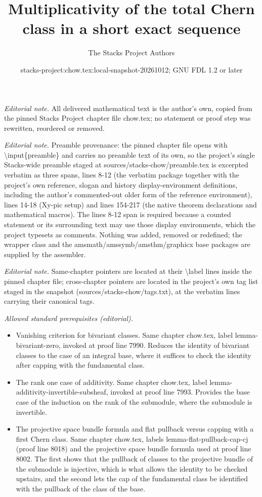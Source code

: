 \documentclass[10pt,a4paper]{amsart}
\title{Multiplicativity of the total Chern class in a short exact sequence}
\author{The Stacks Project Authors}
\date{stacks-project:chow.tex:local-snapshot-20261012; GNU FDL 1.2 or later}
\theoremstyle{plain}
\theoremstyle{definition}
\theoremstyle{remark}
\numberwithin{equation}{subsection}
\begin{document}
\maketitle
\noindent\textit{Editorial note.} All delivered mathematical text is the author's own, copied from the pinned Stacks Project chapter file chow.tex; no statement or proof step was rewritten, reordered or removed.\par\medskip
\noindent\textit{Editorial note.} Preamble provenance: the pinned chapter file opens with \textbackslash{}input\{preamble\} and carries no preamble text of its own, so the project's single Stacks-wide preamble staged at sources/stacks-chow/preamble.tex is excerpted verbatim as three spans, lines 8-12 (the verbatim package together with the project's own reference, slogan and history display-environment definitions, including the author's commented-out older form of the reference environment), lines 14-18 (Xy-pic setup) and lines 154-217 (the native theorem declarations and mathematical macros). The lines 8-12 span is required because a counted statement or its surrounding text may use those display environments, which the project typesets as comments. Nothing was added, removed or redefined; the wrapper class and the amsmath/amssymb/amsthm/graphicx base packages are supplied by the assembler.\par\medskip
\noindent\textit{Editorial note.} Same-chapter pointers are located at their \textbackslash{}label lines inside the pinned chapter file; cross-chapter pointers are located in the project's own tag list staged in the snapshot (sources/stacks-chow/tags.txt), at the verbatim lines carrying their canonical tags.\par\medskip
\noindent\textit{Allowed standard prerequisites (editorial).}\begin{itemize}
\item Vanishing criterion for bivariant classes. Same chapter chow.tex, label lemma-bivariant-zero, invoked at proof line 7990. Reduces the identity of bivariant classes to the case of an integral base, where it suffices to check the identity after capping with the fundamental class.
\item The rank one case of additivity. Same chapter chow.tex, label lemma-additivity-invertible-subsheaf, invoked at proof line 7993. Provides the base case of the induction on the rank of the submodule, where the submodule is invertible.
\item The projective space bundle formula and flat pullback versus capping with a first Chern class. Same chapter chow.tex, labels lemma-flat-pullback-cap-cj (proof line 8018) and the projective space bundle formula used at proof line 8002. The first shows that the pullback of classes to the projective bundle of the submodule is injective, which is what allows the identity to be checked upstairs, and the second lets the cap of the fundamental class be identified with the pullback of the class of the base.
\end{itemize}\medskip
\end{document}
